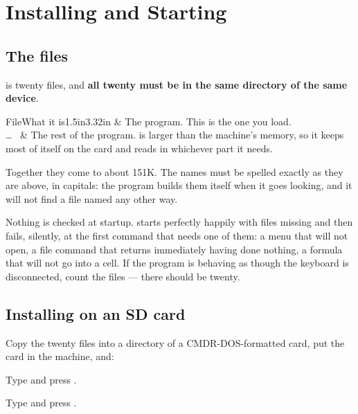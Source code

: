 \chapter{Installing and Starting}
\label{ch:installing}

\section{The files}

\ccprod{} is twenty files, and \textbf{all twenty must be in the same
directory of the same device}.

\begin{cctable}{File}{What it is}{1.5in}{3.32in}
 & The program. This is the one you load. \\
 \dots\  & The rest of the program. \ccprod{}
is larger than the machine's memory, so it keeps most of itself on the card and
reads in whichever part it needs. \\
\end{cctable}

Together they come to about 151K. The names must be spelled exactly as they are
above, in capitals: the program builds them itself when it goes looking, and it
will not find a file named any other way.

\begin{cccaution}
Nothing is checked at startup. \ccprod{} starts perfectly happily with files
missing and then fails, silently, at the first command that needs one of them: a
menu that will not open, a file command that returns immediately having done
nothing, a formula that will not go into a cell. If the program is behaving as
though the keyboard is disconnected, count the files --- there should be
twenty.
\end{cccaution}

\section{Installing on an SD card}

Copy the twenty files into a directory of a CMDR-DOS-formatted card, put the
card in the machine, and:

\begin{ccprocedure}
\item Type  and press .
\item Type  and press .
\end{ccprocedure}

